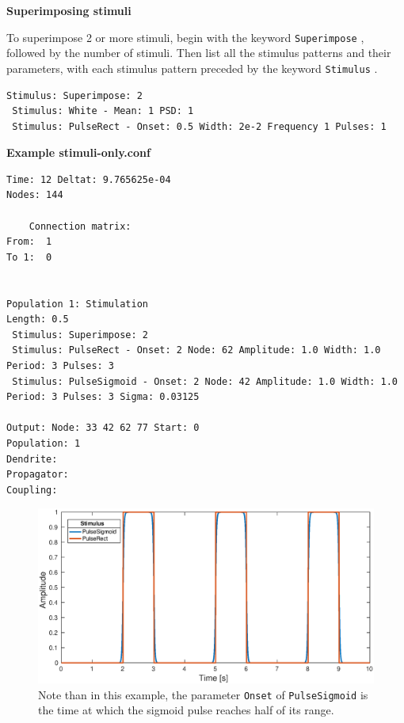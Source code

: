 \documentclass[12pt,a4paper]{article}
\newcommand{\type}[1]{{\small\small\tt #1} }
\begin{document}
\begin{description}
\begin{itemize}
    \vspace{5mm}
    \textbf{Superimposing stimuli}

    To superimpose 2 or more stimuli, begin with the keyword \type{Superimpose}, followed by the number of stimuli. Then list all the stimulus patterns and their parameters, with each stimulus pattern preceded by the keyword \type{Stimulus}.
    \begin{lstlisting}
Stimulus: Superimpose: 2
 Stimulus: White - Mean: 1 PSD: 1
 Stimulus: PulseRect - Onset: 0.5 Width: 2e-2 Frequency 1 Pulses: 1
    \end{lstlisting}

    \vspace{5mm}
    \textbf{Example stimuli-only.conf}

    \begin{lstlisting}
Time: 12 Deltat: 9.765625e-04
Nodes: 144

    Connection matrix:
From:  1 
To 1:  0


Population 1: Stimulation
Length: 0.5
 Stimulus: Superimpose: 2
 Stimulus: PulseRect - Onset: 2 Node: 62 Amplitude: 1.0 Width: 1.0 Period: 3 Pulses: 3
 Stimulus: PulseSigmoid - Onset: 2 Node: 42 Amplitude: 1.0 Width: 1.0 Period: 3 Pulses: 3 Sigma: 0.03125

Output: Node: 33 42 62 77 Start: 0
Population: 1
Dendrite:  
Propagator:
Coupling: 
    \end{lstlisting}
\begin{figure}[h]
\begin{center}
 \includegraphics[width=\textwidth]{img/compare_pulsesigmoid_pulserect.eps}
 \caption{Note than in this example, the parameter \texttt{Onset} of \texttt{PulseSigmoid} is the time at which the sigmoid pulse reaches half of its range.}
\end{center}
\end{figure}


\end{itemize}
\end{description}
\end{document}
